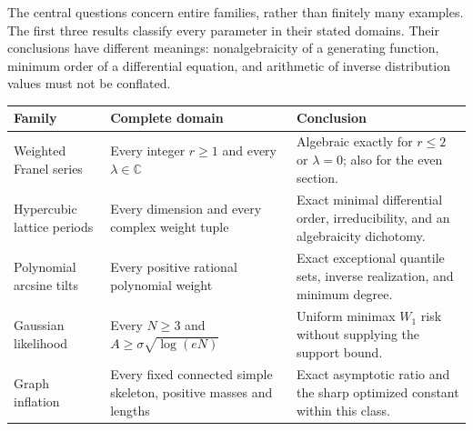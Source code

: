 \documentclass[11pt,a4paper]{article}
\theoremstyle{definition}
\theoremstyle{remark}
\numberwithin{equation}{section}
\begin{document}
The central questions concern entire families, rather than finitely many
examples. The first three results classify every parameter in their stated
domains. Their conclusions have different meanings: nonalgebraicity of a
generating function, minimum order of a differential equation, and arithmetic
of inverse distribution values must not be conflated.

\begin{center}
\small
\begin{tabular}{@{}>{\raggedright\arraybackslash}p{}
                >{\raggedright\arraybackslash}p{}
                >{\raggedright\arraybackslash}p{}@{}}
\toprule
Family & Complete domain & Conclusion \\
\midrule
Weighted Franel series & Every integer $r\ge1$ and every $\lambda\in\mathbb C$
 & Algebraic exactly for $r\le2$ or $\lambda=0$; also for the even section. \\[5pt]
Hypercubic lattice periods & Every dimension and every complex weight tuple
 & Exact minimal differential order, irreducibility, and an algebraicity dichotomy. \\[5pt]
Polynomial arcsine tilts & Every positive rational polynomial weight
 & Exact exceptional quantile sets, inverse realization, and minimum degree. \\[5pt]
Gaussian likelihood & Every $N\ge3$ and $A\ge\sigma\sqrt{\log(eN)}$
 & Uniform minimax $W_1$ risk without supplying the support bound. \\[5pt]
Graph inflation & Every fixed connected simple skeleton, positive masses and lengths
 & Exact asymptotic ratio and the sharp optimized constant within this class. \\
\bottomrule
\end{tabular}
\end{center}
\end{document}

